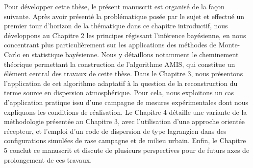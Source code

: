 Pour développer cette thèse, le présent manuscrit est organisé de la façon suivante. Après avoir présenté la problématique posée par le sujet et effectué un premier tour d'horizon de la thématique dans ce chapitre introductif, nous développons au Chapitre 2 les principes régissant l'inférence bayésienne, en nous concentrant plus particulièrement sur les applications des méthodes de Monte-Carlo en statistique bayésienne. Nous y détaillons notamment le cheminement théorique permettant la construction de l'algorithme AMIS, qui constitue un élément central des travaux de cette thèse. 
Dans le Chapitre 3, nous présentons l'application de cet algorithme adaptatif à la question de la reconstruction du terme source en dispersion atmosphérique. Pour cela, nous exploitons un cas d'application pratique issu d'une campagne de mesures expérimentales dont nous expliquons les conditions de réalisation. Le Chapitre 4 détaille une variante de la méthodologie présentée au Chapitre 3, avec l'utilisation d'une approche orientée récepteur, et l'emploi d'un code de dispersion de type lagrangien dans des configurations simulées de rase campagne et de milieu urbain.
Enfin, le Chapitre 5 conclut ce manuscrit et discute de plusieurs perspectives pour de futurs axes de prolongement de ces travaux.\\